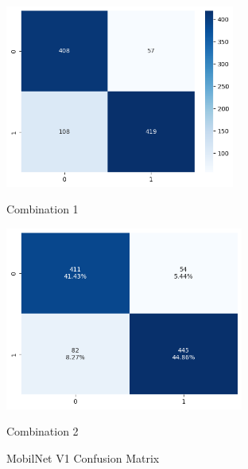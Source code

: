 \begin{figure}[H]
    \centering
    \begin{minipage}[b]{0.49\textwidth}
        \centering
        \includegraphics[width=\textwidth, height=6cm]{Figures/balanced_data/less_data/withoutbn/mn1/cm.png}
        \captionsetup{labelformat=empty}
        \caption{Combination 1}
        \label{fig:u_wo_r_cm}
    \end{minipage}
    \hfill
    \begin{minipage}[b]{0.49\textwidth}
        \centering
        \includegraphics[width=\textwidth, height=6cm]{Figures/balanced_data/less_data/withbn/mn1/cm.png}
        \captionsetup{labelformat=empty}
        \caption{Combination 2}
        \label{fig:u_w_r_cm}
    \end{minipage}
    \captionsetup{labelformat=default}
    \caption{MobilNet V1 Confusion Matrix}
\end{figure}


